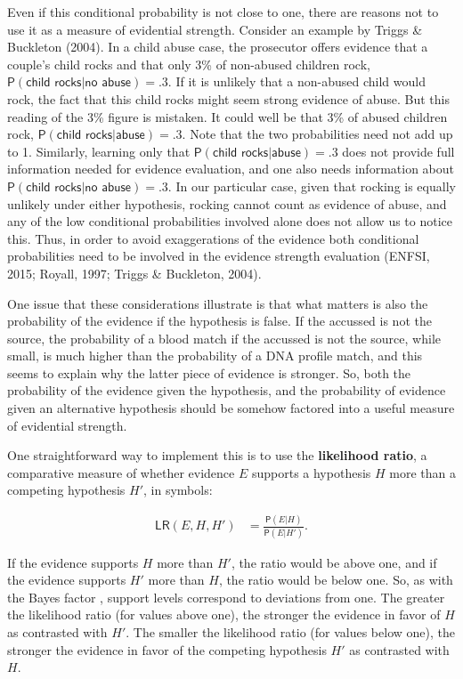 \documentclass[10pt,dvipsnames,enabledeprecatedfontcommands]{scrartcl}
\newcommand{\pr}[1]{\mathsf{P}(#1)}
\begin{document}
Even if this conditional probability is not close to one, there are
reasons not to use it as a measure of evidential strength. Consider an
example by Triggs \& Buckleton (2004). In a child abuse case, the
prosecutor offers \label{text:rock} evidence that a couple's child rocks
and that only 3\% of non-abused children rock,
\(\pr{\textsf{child rocks} \vert \textsf{no abuse}}=.3\). If it is
unlikely that a non-abused child would rock, the fact that this child
rocks might seem strong evidence of abuse. But this reading of the 3\%
figure is mistaken. It could well be that 3\% of abused children rock,
\(\pr{\textsf{child rocks} \vert \textsf{abuse}}=.3\). Note that the two
probabilities need not add up to 1. Similarly, learning only that
\(\pr{\textsf{child rocks} \vert \textsf{abuse}}=.3\) does not provide
full information needed for evidence evaluation, and one also needs
information about
\(\pr{\textsf{child rocks} \vert \textsf{no abuse}}=.3\). In our
particular case, given that rocking is equally unlikely under either
hypothesis, rocking cannot count as evidence of abuse, and any of the
low conditional probabilities involved alone does not allow us to notice
this. Thus, in order to avoid exaggerations of the evidence both
conditional probabilities need to be involved in the evidence strength
evaluation (ENFSI, 2015; Royall, 1997; Triggs \& Buckleton, 2004).

One issue that these considerations illustrate is that what matters is
also the probability of the evidence if the hypothesis is false. If the
accussed is not the source, the probability of a blood match if the
accussed is not the source, while small, is much higher than the
probability of a DNA profile match, and this seems to explain why the
latter piece of evidence is stronger. So, both the probability of the
evidence given the hypothesis, and the probability of evidence given an
alternative hypothesis should be somehow factored into a useful measure
of evidential strength.

One straightforward way to implement this is to use the
\textbf{likelihood ratio}, a comparative measure of whether evidence
\(E\) supports a hypothesis \(H\) more than a competing hypothesis
\(H'\), in symbols:

\begin{align}
\label{eq:LR}
\tag{LR}
\mathsf{LR}(E,H,H') & = \frac{\pr{E \vert H}}{\pr{E \vert H'}}.
\end{align}

\noindent If the evidence supports \(H\) more than \(H'\), the ratio
would be above one, and if the evidence supports \(H'\) more than \(H\),
the ratio would be below one. So, as with the Bayes factor , support
levels correspond to deviations from one. The greater the likelihood
ratio (for values above one), the stronger the evidence in favor of
\(H\) as contrasted with \(H'\). The smaller the likelihood ratio (for
values below one), the stronger the evidence in favor of the competing
hypothesis \(H'\) as contrasted with \(H\).
\end{document}

